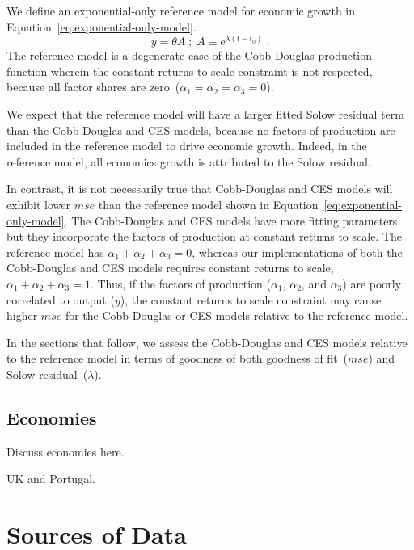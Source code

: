 \documentclass[preprint,authoryear,12pt]{elsarticle}\usepackage[]{graphicx}\usepackage[]{color}
\begin{document}
We define an exponential-only reference model for economic growth
in Equation~\ref{eq:exponential-only-model}.
%
\begin{equation} \label{eq:exponential-only-model}
  y = \theta A \; ; \; A \equiv \mathrm{e}^{\lambda(t-t_0)} \; .
\end{equation}
%
The reference model is a degenerate case of the Cobb-Douglas production function
wherein the constant returns to scale constraint is not respected,
because all factor shares are zero~($\alpha_1 = \alpha_2 = \alpha_3 = 0$).

We expect that the reference model will have a larger fitted Solow residual term than
the Cobb-Douglas and CES models, because no factors of production are
included in the reference model to drive economic growth.
Indeed, in the reference model, 
all economics growth is attributed to the Solow residual.

In contrast, it is not necessarily true that 
Cobb-Douglas and CES models 
will exhibit lower $mse$ than the reference model
shown in Equation~\ref{eq:exponential-only-model}.
The Cobb-Douglas and CES models have more fitting parameters,
but they incorporate the factors of production
at constant returns to scale. 
The reference model has $\alpha_1 + \alpha_2 + \alpha_3 = 0$,
whereas our implementations of both the Cobb-Douglas and CES models
requires constant returns to scale, $\alpha_1 + \alpha_2 + \alpha_3 = 1$.
Thus, if the factors of production ($\alpha_1$, $\alpha_2$, and $\alpha_3$) 
are poorly correlated to output ($y$),
the constant returns to scale constraint may cause higher $mse$ for
the Cobb-Douglas or CES models relative to the reference model.

In the sections that follow, 
we assess the Cobb-Douglas and CES models relative to the reference model
in terms of goodness of both goodness of fit~($mse$) and Solow residual~($\lambda$).


\subsection{Economies} 
\label{sec:Economies}

Discuss economies here.

UK and Portugal.


\section{Sources of Data}
\label{sec:Sources_of_Data}
\end{document}
